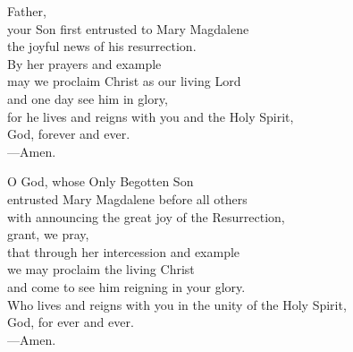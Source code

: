\prayer


\begin{prayerverse}
Father,\\
your Son first entrusted to Mary Magdalene\\
the joyful news of his resurrection.\\
By her prayers and example\\
may we proclaim Christ as our living Lord\\
and one day see him in glory,\\
for he lives and reigns with you and the Holy Spirit,\\
God, forever and ever.\\
{\color{red}---\thinspace}Amen.
\end{prayerverse}


\begin{prayerverse}
O God, whose Only Begotten Son\\
entrusted Mary Magdalene before all others\\
with announcing the great joy of the Resurrection,\\
grant, we pray,\\
that through her intercession and example\\
we may proclaim the living Christ\\
and come to see him reigning in your glory.\\
Who lives and reigns with you in the unity of the Holy Spirit,\\
God, for ever and ever.\\
{\color{red}---\thinspace}Amen.
\end{prayerverse}

